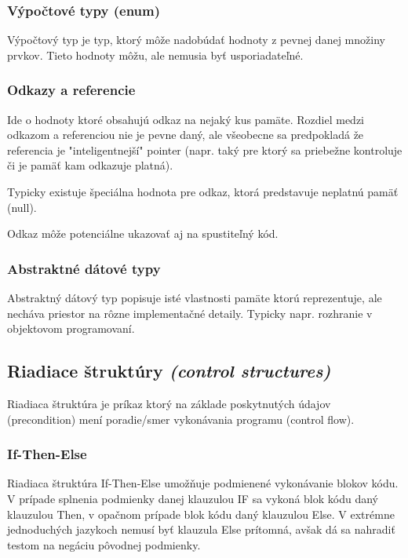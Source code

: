 \documentclass[a4paper,10pt]{article}
\begin{document}
\begin{multicols}{2}
	\subsubsection{Výpočtové typy (enum)}
		
		Výpočtový typ je typ, ktorý môže nadobúdať hodnoty z pevnej danej množiny prvkov. Tieto hodnoty môžu, ale nemusia byť usporiadateľné. 
		
	\subsubsection{Odkazy a referencie}
	
		Ide o hodnoty ktoré obsahujú odkaz na nejaký kus pamäte. Rozdiel medzi odkazom a referenciou nie je pevne daný, ale všeobecne sa predpokladá že referencia je "inteligentnejší" pointer (napr. taký pre ktorý sa priebežne kontroluje či je pamäť kam odkazuje platná). 
		
		Typicky existuje špeciálna hodnota pre odkaz, ktorá predstavuje neplatnú pamäť (null). 

		Odkaz môže potenciálne ukazovať aj na spustiteľný kód.
		
	\subsubsection{Abstraktné dátové typy}
	
		Abstraktný dátový typ popisuje isté vlastnosti pamäte ktorú reprezentuje, ale necháva priestor na rôzne implementačné detaily. Typicky napr. rozhranie v objektovom programovaní.
		
\subsection{Riadiace štruktúry \emph{(control structures)}}

	Riadiaca štruktúra je príkaz ktorý na základe poskytnutých údajov (precondition) mení poradie/smer vykonávania programu (control flow).	
	
	\subsubsection{If-Then-Else}

		Riadiaca štruktúra If-Then-Else umožňuje podmienené vykonávanie blokov kódu. V prípade splnenia podmienky danej klauzulou IF sa vykoná blok kódu daný klauzulou Then, v opačnom prípade blok kódu daný klauzulou Else. V extrémne jednoduchých jazykoch nemusí byť klauzula Else prítomná, avšak dá sa nahradiť testom na negáciu pôvodnej podmienky. 
		

\end{multicols}
\end{document}

